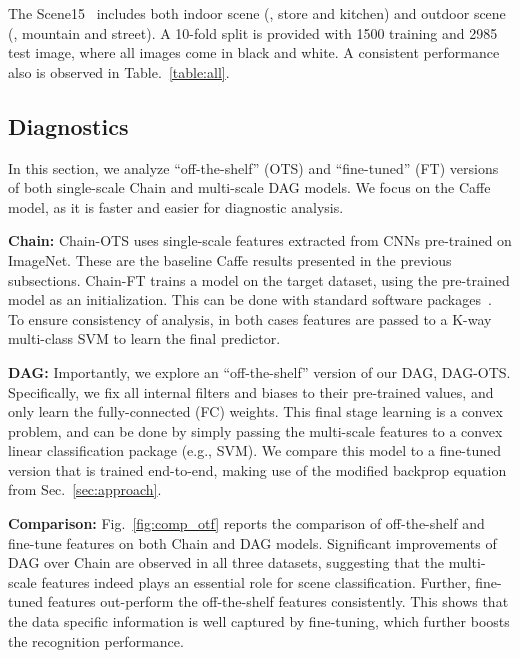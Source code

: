 \documentclass[10pt,twocolumn,letterpaper]{article}
\begin{document}
The Scene15~\cite{Scene15} includes both indoor scene (\eg, store and kitchen) and outdoor scene (\eg, mountain and street). A 10-fold split is provided with 1500 training and 2985 test image, where all images come in black and white. A consistent performance also is observed in Table.~\ref{table:all}. 


\subsection{Diagnostics \label{sec:diag}}
In this section, we analyze ``off-the-shelf'' (OTS) and ``fine-tuned'' (FT) versions of both single-scale Chain and multi-scale DAG models. We focus on the Caffe model, as it is faster and easier for diagnostic analysis. 

{\bf Chain:} Chain-OTS uses single-scale features extracted from CNNs pre-trained on ImageNet. These are the baseline Caffe results presented in the previous subsections. Chain-FT trains a model on the target dataset, using the pre-trained model as an initialization. This can be done with standard software packages~\cite{vedaldimatconvnet}. To ensure consistency of analysis, in both cases features are passed to a K-way multi-class SVM to learn the final predictor. %

{\bf DAG:} Importantly, we explore an ``off-the-shelf'' version of our DAG, DAG-OTS.  Specifically, we fix all internal filters and biases to their pre-trained values, and only learn the fully-connected (FC) weights. This final stage learning is a convex problem, and can be done by simply passing the multi-scale features to a convex linear classification package (e.g., SVM). We compare this model to a fine-tuned version that is trained end-to-end, making use of the modified backprop equation from Sec.~\ref{sec:approach}. %

{\bf Comparison:} Fig.~\ref{fig:comp_otf} reports the comparison of off-the-shelf and fine-tune features on both Chain and DAG models. Significant improvements of DAG over Chain are observed in all three datasets, suggesting that the multi-scale features indeed plays an essential role for scene classification. Further, fine-tuned features out-perform the off-the-shelf features consistently. This shows that the data specific information is well captured by fine-tuning, which further boosts the recognition performance. 
\end{document}
